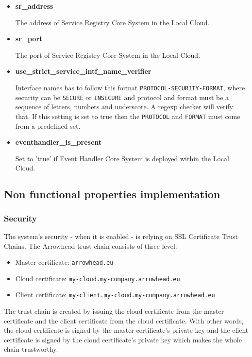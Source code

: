 \documentclass[a4paper]{arrowhead}
\begin{document}
\begin{itemize}
    \item \textbf{sr\_address}
  
    The address of Service Registry Core System in the Local Cloud.
    
    \item \textbf{sr\_port}
  
    The port of Service Registry Core System in the Local Cloud.
    
    \item \textbf{use\_strict\_service\_intf\_name\_verifier}
  
    Interface names has to follow this format \texttt{PROTOCOL-SECURITY-FORMAT}, where security can be \texttt{SECURE} or \texttt{INSECURE} and protocol and format must be a sequence of letters, numbers and underscore. A regexp checker will verify that. If this setting is set to true then the \texttt{PROTOCOL} and \texttt{FORMAT} must come from a predefined set.
    
    \item \textbf{eventhandler\_is\_present}
  
    Set to 'true' if Event Handler Core System is deployed within the Local Cloud.
    
\end{itemize}

\subsection {Non functional properties implementation}

\subsubsection {Security}

The system's security - when it is enabled - is relying on SSL Certificate Trust Chains. The Arrowhead trust chain consists of three level:

\begin{itemize}
    \item Master certificate: \texttt{arrowhead.eu}
    \item Cloud certificate: \texttt{my-cloud.my-company.arrowhead.eu}
    \item Client certificate: \texttt{my-client.my-cloud.my-company.arrowhead.eu}
\end{itemize}

The trust chain is created by issuing the cloud certificate from the master certificate and the client certificate from the cloud certificate. With other words, the cloud certificate is signed by the master certificate's private key and the client certificate is signed by the cloud certificate's private key which makes the whole chain trustworthy.
\end{document}
